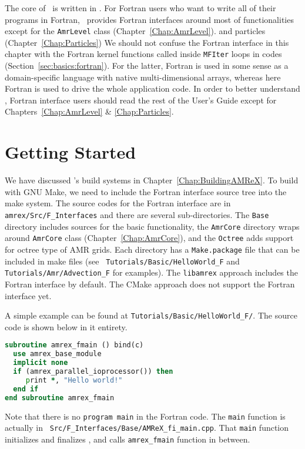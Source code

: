 The core of \amrex\ is written in \cpp.  For Fortran users who want to
write all of their programs in Fortran, \amrex\ provides Fortran
interfaces around most of functionalities except for 
the {\tt AmrLevel} class (Chapter~\ref{Chap:AmrLevel}).  
and particles (Chapter~\ref{Chap:Particles}) 
We should not confuse the Fortran
interface in this chapter with the Fortran kernel functions called
inside {\tt MFIter} loops in \cpp codes
(Section~\ref{sec:basics:fortran}).  For the latter, Fortran is used
in some sense as a domain-specific language with native
multi-dimensional arrays, whereas here Fortran is used to drive the
whole application code.  In order to better understand \amrex, Fortran
interface users should read the rest of the User's Guide except for
Chapters~\ref{Chap:AmrLevel} \& \ref{Chap:Particles}. 

\section{Getting Started}

We have discussed \amrex's build systems in
Chapter~\ref{Chap:BuildingAMReX}.  To build with GNU Make, we need to
include the Fortran interface source tree into the make system.  The
source codes for the Fortran interface are in {\tt
amrex/Src/F\_Interfaces} and there are several sub-directories.  The
{\tt Base} directory includes sources for the basic functionality, the
{\tt AmrCore} directory wraps around {\tt AmrCore} class
(Chapter~\ref{Chap:AmrCore}), and the {\tt Octree} adds support for
octree type of AMR grids.  Each directory has a {\tt Make.package}
file that can be included in make files (see {\tt
Tutorials/Basic/HelloWorld\_F} and {\tt Tutorials/Amr/Advection\_F}
for examples).  The {\tt libamrex} approach includes the Fortran
interface by default.  The CMake approach does not support the Fortran
interface yet.

A simple example can be found at {\tt Tutorials/Basic/HelloWorld\_F/}.
The source code is shown below in it entirety.  
\begin{lstlisting}[language=fortran]
subroutine amrex_fmain () bind(c)
  use amrex_base_module
  implicit none
  if (amrex_parallel_ioprocessor()) then
     print *, "Hello world!"
  end if
end subroutine amrex_fmain
\end{lstlisting}
Note that there is no {\tt program main} in the Fortran code.  The
{\tt main} function is actually in {\tt
  Src/F\_Interfaces/Base/AMReX\_fi\_main.cpp}.  That {\tt main}
function initializes and finalizes \amrex, and calls {\tt amrex\_fmain}
function in between.

